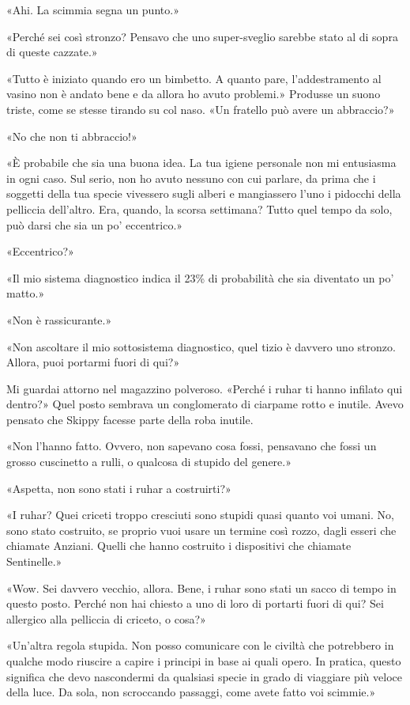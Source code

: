 «Ahi. La scimmia segna un punto.»

«Perché sei così stronzo? Pensavo che uno super-sveglio sarebbe stato al
di sopra di queste cazzate.»

«Tutto è iniziato quando ero un bimbetto. A quanto pare, l'addestramento
al vasino non è andato bene e da allora ho avuto problemi.» Produsse un
suono triste, come se stesse tirando su col naso. «Un fratello può avere
un abbraccio?»

«No che non ti abbraccio!»

«È probabile che sia una buona idea. La tua igiene personale non mi
entusiasma in ogni caso. Sul serio, non ho avuto nessuno con cui
parlare, da prima che i soggetti della tua specie vivessero sugli alberi
e mangiassero l'uno i pidocchi della pelliccia dell'altro. Era, quando,
la scorsa settimana? Tutto quel tempo da solo, può darsi che sia un po'
eccentrico.»

«Eccentrico?»

«Il mio sistema diagnostico indica il 23\% di probabilità che sia
diventato un po' matto.»

«Non è rassicurante.»

«Non ascoltare il mio sottosistema diagnostico, quel tizio è davvero uno
stronzo. Allora, puoi portarmi fuori di qui?»

Mi guardai attorno nel magazzino polveroso. «Perché i ruhar ti hanno
infilato qui dentro?» Quel posto sembrava un conglomerato di ciarpame
rotto e inutile. Avevo pensato che Skippy facesse parte della roba
inutile.

«Non l'hanno fatto. Ovvero, non sapevano cosa fossi, pensavano che fossi
un grosso cuscinetto a rulli, o qualcosa di stupido del genere.»

«Aspetta, non sono stati i ruhar a costruirti?»

«I ruhar? Quei criceti troppo cresciuti sono stupidi quasi quanto voi
umani. No, sono stato costruito, se proprio vuoi usare un termine così
rozzo, dagli esseri che chiamate Anziani. Quelli che hanno costruito i
dispositivi che chiamate Sentinelle.»

«Wow. Sei davvero vecchio, allora. Bene, i ruhar sono stati un sacco di
tempo in questo posto. Perché non hai chiesto a uno di loro di portarti
fuori di qui? Sei allergico alla pelliccia di criceto, o cosa?»

«Un'altra regola stupida. Non posso comunicare con le civiltà che
potrebbero in qualche modo riuscire a capire i principi in base ai quali
opero. In pratica, questo significa che devo nascondermi da qualsiasi
specie in grado di viaggiare più veloce della luce. Da sola, non
scroccando passaggi, come avete fatto voi scimmie.»

